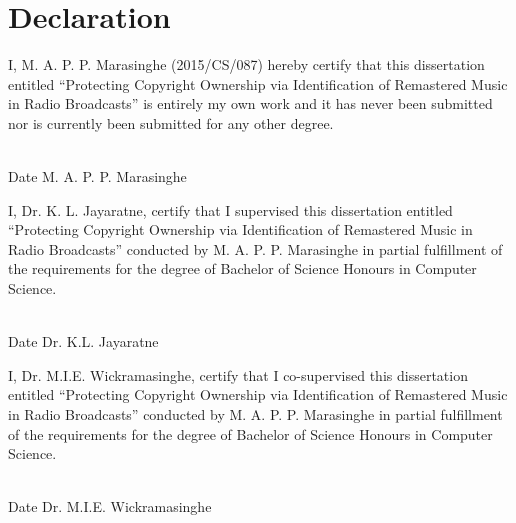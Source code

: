 \chapter*{Declaration}

I, M. A. P. P. Marasinghe (2015/CS/087) hereby certify that this dissertation entitled “Protecting Copyright Ownership via Identification of Remastered Music in Radio Broadcasts” is entirely my own work and it has never been submitted nor is currently been submitted for any other degree.


\vspace{1.75cm}
\noindent
\makebox[130pt]{\dotfill}\hspace{120pt}\makebox[150pt]{\dotfill} \\
\mbox{}\hspace{50pt}Date \hspace{190pt} M. A. P. P. Marasinghe  


\vspace{1cm}
\noindent
I, Dr. K. L. Jayaratne, certify that I supervised this dissertation entitled “Protecting Copyright Ownership via Identification of Remastered Music in Radio Broadcasts” conducted by M. A. P. P. Marasinghe in partial fulfillment of the requirements for the degree of Bachelor of Science Honours in Computer Science. 


\vspace{1.75cm}
\noindent
\makebox[130pt]{\dotfill}\hspace{120pt}\makebox[150pt]{\dotfill} \\
\mbox{}\hspace{50pt}Date \hspace{200pt} Dr. K.L. Jayaratne 

\vspace{1cm}
\noindent
I, Dr. M.I.E. Wickramasinghe, certify that I co-supervised this dissertation entitled “Protecting Copyright Ownership via Identification of Remastered Music in Radio Broadcasts” conducted by M. A. P. P. Marasinghe in partial fulfillment of the requirements for the degree of Bachelor of Science Honours in Computer Science. 

\vspace{1.75cm}
\noindent
\makebox[130pt]{\dotfill}\hspace{120pt}\makebox[150pt]{\dotfill} \\
\mbox{}\hspace{50pt}Date \hspace{170pt} Dr. M.I.E. Wickramasinghe 